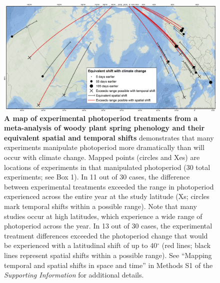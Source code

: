 \documentclass{article}
\begin{document}
\begin{figure}[h]
\centering
\includegraphics{..//..//analyses/photoperiod/figures/ospree_photopmap_fromblake.jpg} 
\caption{\textbf{A map of experimental photoperiod treatments from a meta-analysis of woody plant spring phenology and their equivalent spatial and temporal shifts} demonstrates that many experiments manipulate photoperiod more dramatically than will occur with climate change. Mapped points (circles and Xes) are locations of experiments in \citet{wolkovich2019} that manipulated photoperiod (30 total experiments; see Box 1). In 11 out of 30 cases, the difference between experimental treatments exceeded the range in photoperiod experienced across the entire year at the study latitude (Xs; circles mark temporal shifts within a possible range). Note that many studies occur at high latitudes, which experience a wide range of photoperiod across the year. In 13 out of 30 cases, the experimental treatment differences exceeded the photoperiod change that would be experienced with a latitudinal shift of up to 40$^{\circ}$ (red lines; black lines represent spatial shifts within a possible range). See ``Mapping temporal and spatial shifts in space and time'' in Methods S1 of the \emph{Supporting Information} for additional details. }
 \label{fig:photomap}
 \end{figure}
\end{document}
